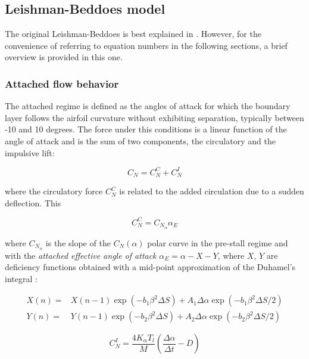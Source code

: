\subsection{Leishman-Beddoes model}

The original Leishman-Beddoes is best explained in \cite{bangga_improved_2020}. However, for the convenience of referring to equation numbers in the following sections, a brief overview is provided in this one. 

\subsubsection{Attached flow behavior}

The attached regime is defined as the angles of attack for which the boundary layer follows the airfoil curvature without exhibiting separation, typically between -10 and 10 degrees. The force under this conditions is a linear function of the angle of attack and is the sum of two components, the circulatory and the impulsive lift: 

\begin{equation}
C_N = C_N^C + C_N^I
\end{equation}

\noindent where the circulatory force $C_N^C$ is related to the added circulation due to a sudden deflection. This 

\begin{equation}
C_N^C = C_{N_\alpha} \alpha_{E}
\label{eq:circulatory}
\end{equation}

\noindent where $C_{N_\alpha}$ is the slope of the $C_N(\alpha)$ polar curve in the pre-stall regime and with the \textit{attached effective angle of attack} $\alpha_E = \alpha - X - Y$, where $X$, $Y$ are deficiency functions obtained with a mid-point approximation of the Duhamel's integral \cite{leishman_principles_2006}:

\begin{eqnarray}
X(n)= & X(n-1) \exp \left(-b_{1} \beta^{2} \Delta S\right)+A_{1} \Delta \alpha \exp \left(-b_{1} \beta^{2} \Delta S / 2\right) \\
Y(n)= & Y(n-1) \exp \left(-b_{2} \beta^{2} \Delta S\right)+A_{2} \Delta \alpha \exp \left(-b_{2} \beta^{2} \Delta S / 2\right)
\end{eqnarray}

\begin{equation}
C_{N}^{I}=\frac{4 K_{\alpha} T_{l}}{M}\left(\frac{\Delta \alpha}{\Delta t}-D\right)
\label{eq:impulsive}
\end{equation}

